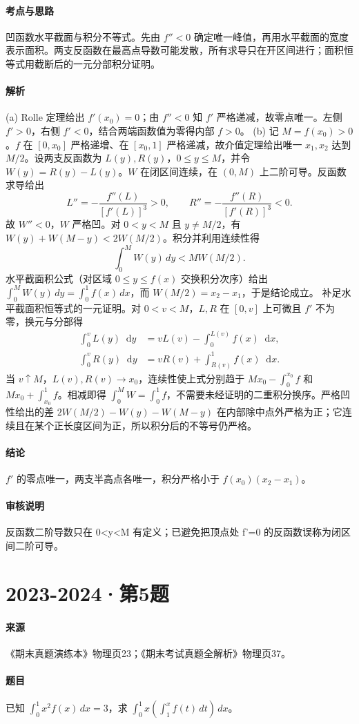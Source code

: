 \documentclass[UTF8,fontset=fandol,12pt,oneside,openany]{ctexrep}
\newcommand{\dd}{\mathop{}\!\mathrm d}
\theoremstyle{definition}
\begin{document}
\paragraph{考点与思路}
凹函数水平截面与积分不等式。先由 $f''<0$ 确定唯一峰值，再用水平截面的宽度表示面积。两支反函数在最高点导数可能发散，所有求导只在开区间进行；面积恒等式用截断后的一元分部积分证明。
\paragraph{解析}
(a) Rolle 定理给出 $f'(x_0)=0$；由 $f''<0$ 知 $f'$ 严格递减，故零点唯一。左侧 $f'>0$，右侧 $f'<0$，结合两端函数值为零得内部 $f>0$。
(b) 记 $M=f(x_0)>0$。$f$ 在 $[0,x_0]$ 严格递增、在 $[x_0,1]$ 严格递减，故介值定理给出唯一 $x_1,x_2$ 达到 $M/2$。设两支反函数为 $L(y),R(y)$，$0\le y\le M$，并令 $W(y)=R(y)-L(y)$。$W$ 在闭区间连续，在 $(0,M)$ 上二阶可导。反函数求导给出
\[L''=-\frac{f''(L)}{[f'(L)]^3}>0,\qquad R''=-\frac{f''(R)}{[f'(R)]^3}<0.\]
故 $W''<0$，$W$ 严格凹。对 $0<y<M$ 且 $y\ne M/2$，有 $W(y)+W(M-y)<2W(M/2)$。积分并利用连续性得
\[\int_0^M W(y)\,dy<MW(M/2).\]
水平截面积公式（对区域 $0\le y\le f(x)$ 交换积分次序）给出 $\int_0^M W(y)\,dy=\int_0^1f(x)\,dx$，而 $W(M/2)=x_2-x_1$，于是结论成立。
补足水平截面积恒等式的一元证明。对 $0<v<M$，$L,R$ 在 $[0,v]$ 上可微且 $f'$ 不为零，换元与分部得
\begin{align*}
\int_0^vL(y)\dd y&=vL(v)-\int_0^{L(v)}f(x)\dd x,\\
\int_0^vR(y)\dd y&=vR(v)+\int_{R(v)}^1f(x)\dd x.
\end{align*}
当 $v\uparrow M$，$L(v),R(v)\to x_0$，连续性使上式分别趋于 $Mx_0-\int_0^{x_0}f$ 和 $Mx_0+\int_{x_0}^1f$。相减即得 $\int_0^MW=\int_0^1f$，不需要未经证明的二重积分换序。严格凹性给出的差 $2W(M/2)-W(y)-W(M-y)$ 在内部除中点外严格为正；它连续且在某个正长度区间为正，所以积分后的不等号仍严格。
\paragraph{结论}
$f'$ 的零点唯一，两支半高点各唯一，积分严格小于 $f(x_0)(x_2-x_1)$。
\paragraph{审核说明}
反函数二阶导数只在 0<y<M 有定义；已避免把顶点处 f'=0 的反函数误称为闭区间二阶可导。

\par\addvspace{18pt}\noindent\begin{minipage}{\linewidth}
\section{2023-2024·第5题}
\label{exam:11:q4}
\paragraph{来源} 《期末真题演练本》物理页23；《期末考试真题全解析》物理页37。
\paragraph{题目}
已知 $\int_0^1x^2f(x)\,dx=3$，求 $\int_0^1x\left(\int_1^x f(t)\,dt\right)\,dx$。
\end{minipage}\par
\end{document}
